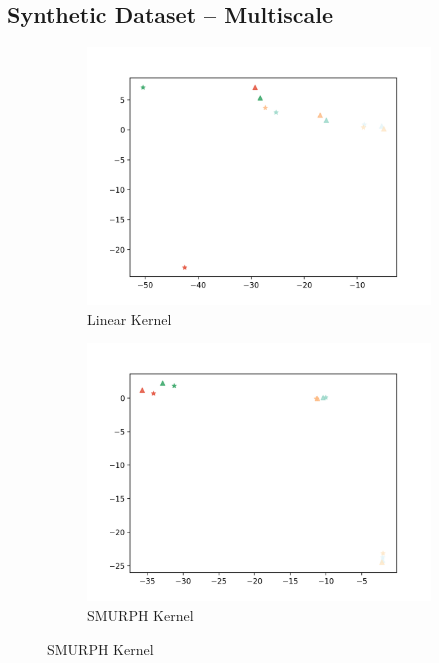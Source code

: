 \documentclass[10pt]{article}
\begin{document}
\subsection{Synthetic Dataset -- Multiscale}

\begin{figure}[H]
    \centering
    \begin{subfigure}[h]{0.3\textwidth}
        \includegraphics[width=\linewidth]{ms_linear}
        \caption{Linear Kernel}
    \end{subfigure}
    \begin{subfigure}[h]{0.3\textwidth}
        \includegraphics[width=\linewidth]{ms_smurf}
        \caption{SMURPH Kernel}
    \end{subfigure}%

\end{figure}
\end{document}
